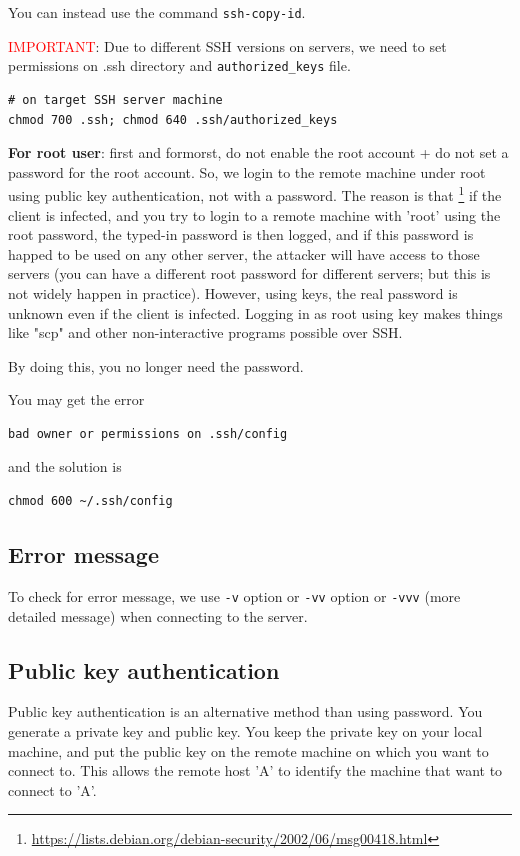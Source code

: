 You can instead use the command \verb!ssh-copy-id!.

\textcolor{red}{IMPORTANT}: 
Due to different SSH versions on servers, 
we need to set permissions on .ssh directory and \verb!authorized_keys! file.
\begin{verbatim}
# on target SSH server machine
chmod 700 .ssh; chmod 640 .ssh/authorized_keys

\end{verbatim}

{\bf For root user}: first and formorst, do not enable the root account + do not
set a password for the root account. So, we login to the remote machine under
root using public key authentication, not with a password. The reason is that
\footnote{\url{https://lists.debian.org/debian-security/2002/06/msg00418.html}}
if the client is infected, and you try to login to a remote machine with
'root' using the root password, the typed-in password is then logged, and if
this password is happed to be used on any other server, the attacker will have
access to those servers (you can have a different root password for different
servers; but this is not widely happen in practice). However, using keys, the
real password is unknown even if the client is infected. Logging in as root
using key  makes things like "scp" and other non-interactive programs possible
over SSH.

By doing this, you no longer need the password.

You may get the error
\begin{verbatim}
bad owner or permissions on .ssh/config 
\end{verbatim}
and the solution is 
\begin{verbatim}
chmod 600 ~/.ssh/config
\end{verbatim}

\subsection{Error message}

To check for error message, we use \verb!-v! option or \verb!-vv! option or
\verb!-vvv! (more detailed message) when connecting to the server.

\subsection{Public key authentication}
\label{sec:public-private-key}

Public key authentication is an alternative method than using password. You
generate a private key and public key. You keep the private key on your
local machine, and put the public key on the remote machine on which you want to
connect to. This allows the remote host 'A' to identify the machine that want to
connect to 'A'. 

